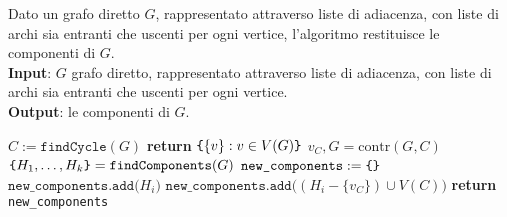 \documentclass[a4paper, 12pt]{report}
\begin{document}
    \begin{algorithm}[H]
        \caption{
            Dato un grafo diretto $G$, rappresentato attraverso liste di adiacenza, con liste di archi sia entranti che uscenti per ogni vertice, l'algoritmo restituisce le componenti di $G$.\\
            \textbf{Input}: $G$ grafo diretto, rappresentato attraverso liste di adiacenza, con liste di archi sia entranti che uscenti per ogni vertice.\\
            \textbf{Output}: le componenti di $G$.
        }

        \begin{algorithmic}[1]
                \State $C := \texttt{findCycle}(G)$
                    \State \textbf{return} $\verb|{|\{v\} : v \in V(G)\verb|}|$ 
                \Else
                    \State $v_C, G = \mathrm{contr}(G, C)$ 
                    \State $\verb|{|H_1, \ldots, H_k\verb|}| = \texttt{findComponents}(G)$
                    \State $\texttt{new\_components} := \verb|{|\verb|}|$ 
                            \State $\texttt{new\_components.add(}H_i\texttt{)}$
                        \Else
                        \State $\texttt{new\_components.add(}(H_i - \{v_C\}) \cup V(C)\texttt{)}$
                        \EndIf
                    \EndFor
                \EndIf
                \State \textbf{return} \texttt{new\_components}
            \EndFunction
        \end{algorithmic}
    \end{algorithm}
\end{document}
